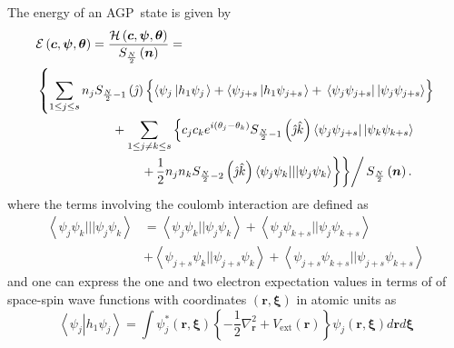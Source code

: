 \documentclass[aps,preprint]{revtex4}%
\begin{document}
The energy of an AGP\ state is given by
\begin{align}
&  \mathcal{E}\left(  \boldsymbol{c},\boldsymbol{\psi},\boldsymbol{\theta
}\right)  =\frac{\mathcal{H}\left(  \boldsymbol{c},\boldsymbol{\psi
},\boldsymbol{\theta}\right)  }{S_{\frac{N}{2}}\left(  \boldsymbol{n}\right)
}=\nonumber\\
&  \left\{  \sum_{1\leq j\leq s}n_{j}S_{\frac{N}{2}-1}\left(  \hat{\jmath
}\right)  \left\{  \overset{}{\left\langle \psi_{j}\left\vert h_{1}\psi
_{j}\right.  \right\rangle +\left\langle \psi_{j+s}\left\vert h_{1}\psi
_{j+s}\right.  \right\rangle }+\,\left\langle \psi_{j}\psi_{j+s}\right\vert
\left\vert \psi_{j}\psi_{j+s}\right\rangle \right\}  \right. \nonumber\\
&  \qquad\qquad\qquad+\sum_{1\leq j\neq k\leq s}\left\{  c_{j}c_{k}e^{i\left(
\theta_{j}-\theta_{k}\right)  }S_{\frac{N}{2}-1}\left(  \hat{\jmath}\hat
{k}\right)  \left\langle \psi_{j}\psi_{j+s}\right\vert \left\vert \psi_{k}%
\psi_{k+s}\right\rangle \right. \nonumber\\
&  \qquad\qquad\qquad\qquad\left.  \left.  \left.  +\,\frac{1}{2}\overset
{}{n_{j}n_{k}S_{\frac{N}{2}-2}\left(  \hat{\jmath}\hat{k}\right)  \left\langle
\psi_{j}\psi_{k}|||\psi_{j}\psi_{k}\right\rangle }\right\}  \right\}  \right/
S_{\frac{N}{2}}\left(  \boldsymbol{n}\right)  . \label{EnFunc}%
\end{align}
where the terms involving the coulomb interaction are defined as
\begin{align}
\left\langle \psi_{j}\psi_{k}|||\psi_{j}\psi_{k}\right\rangle  &
=\left\langle \psi_{j}\psi_{k}||\psi_{j}\psi_{k}\right\rangle +\left\langle
\psi_{j}\psi_{k+s}||\psi_{j}\psi_{k+s}\right\rangle \nonumber\\
&  +\left\langle \psi_{j+s}\psi_{k}||\psi_{j+s}\psi_{k}\right\rangle
+\left\langle \psi_{j+s}\psi_{k+s}||\psi_{j+s}\psi_{k+s}\right\rangle
\end{align}
and one can express the one and two electron expectation values in terms of of
space-spin wave functions with coordinates $\left(  \boldsymbol{r}%
,\boldsymbol{\xi}\right)  $ in atomic units as
\begin{equation}
\left\langle \psi_{j}\left\vert h_{1}\psi_{j}\right.  \right\rangle =\int
\psi_{j}^{\ast}\left(  \boldsymbol{r},\boldsymbol{\xi}\right)  \left\{
-\frac{1}{2}\nabla_{\boldsymbol{r}}^{2}+V_{\text{ext}}\left(  \boldsymbol{r}%
\right)  \right\}  \psi_{j}\left(  \boldsymbol{r},\boldsymbol{\xi}\right)
d\boldsymbol{r}d\boldsymbol{\xi}%
\end{equation}
\end{document}
